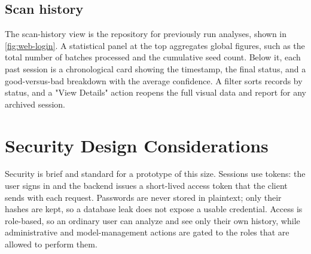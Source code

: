 
\subsection{Scan history}

The scan-history view is the repository for previously run analyses, shown in
\autoref{fig:web-login}. A statistical panel at the top aggregates global
figures, such as the total number of batches processed and the cumulative seed
count. Below it, each past session is a chronological card showing the timestamp,
the final status, and a good-versus-bad breakdown with the average confidence. A
filter sorts records by status, and a "View Details" action reopens the full
visual data and report for any archived session.


\section{Security Design Considerations}

Security is brief and standard for a prototype of this size. Sessions use tokens:
the user signs in and the backend issues a short-lived access token that the
client sends with each request. Passwords are never stored in
plaintext; only their hashes are kept, so a database leak does not expose a usable
credential. Access is role-based, so an ordinary user can analyze and see only
their own history, while administrative and model-management actions are gated to
the roles that are allowed to perform them.
